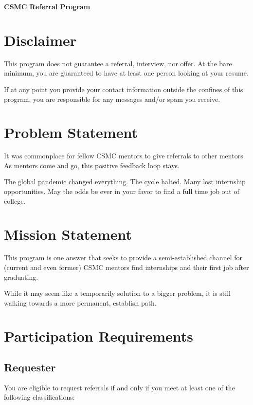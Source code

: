 \documentclass[letterpaper, 12pt]{article}
\begin{document}
\begin{center}
    \bfseries\Large CSMC Referral Program
\end{center}

\section{Disclaimer}\label{section:disclaimer}

This program does not guarantee a referral, interview, nor offer. At the
bare minimum, you are guaranteed to have at least one person looking at your
resume.

If at any point you provide your contact information outside the confines of
this program, you are responsible for any messages and/or spam you
receive.\label{section:disclaimer:spamMessages}

\section{Problem Statement}

It was commonplace for fellow CSMC mentors to give referrals to other mentors.
As mentors come and go, this positive feedback loop stays.

The global pandemic changed everything. The cycle halted. Many lost internship
opportunities. May the odds be ever in your favor to find a full time job out of
college.

\section{Mission Statement}

This program is one answer that seeks to provide a semi-established channel for
(current and even former) CSMC mentors find internships and their first job after
graduating.

While it may seem like a temporarily solution to a bigger problem, it is still
walking towards a more permanent, establish path.

\section{Participation Requirements}

\subsection{Requester}

You are eligible to request referrals if and only if you meet at least one of
the following classifications:
\end{document}

